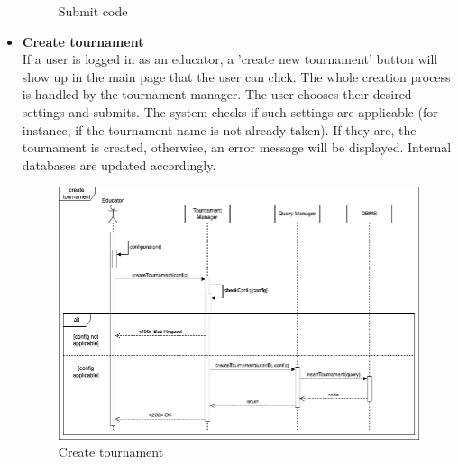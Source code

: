 \begin{itemize}
\begin{figure} [h]
        \caption{Submit code}
        \label{fig:Submit code}
    \end{figure}
    \newpage
    \item \textbf{Create tournament}\\
    If a user is logged in as an educator, a 'create new tournament' button will show up in the main page that the user can click. The whole creation process is handled by the tournament 
    manager. The user chooses their desired settings and submits. The system checks if such settings are applicable (for instance, if the tournament name is not already taken). 
    If they are, the tournament is created, otherwise, an error message will be displayed. Internal databases are updated accordingly.
    \begin{figure}[h]
        \centering
        \includegraphics[width=1\linewidth]{src/Create tournament.png}
        \caption{Create tournament}
        \label{fig:Create tournament}
    \end{figure}


\end{itemize}
